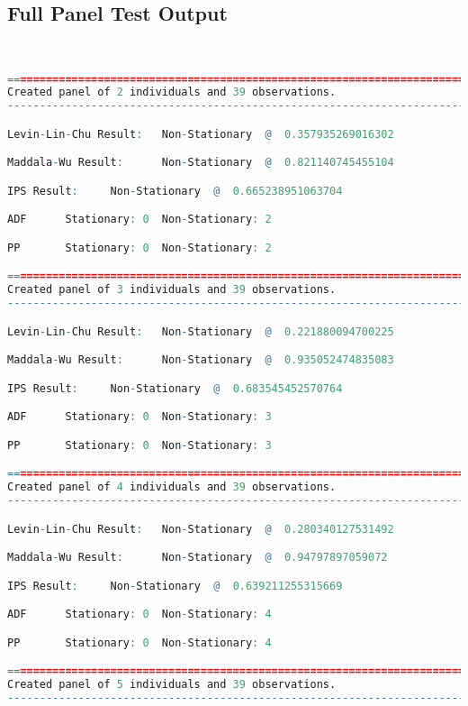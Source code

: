 \subsection{Full Panel Test Output}
\lstset{basicstyle=\tiny\tt,style=myStyle,breaklines=true,}

\begin{lstlisting}[language=R]


=========================================================================
Created panel of 2 individuals and 39 observations.
-------------------------------------------------------------------------

Levin-Lin-Chu Result:   Non-Stationary  @  0.357935269016302

Maddala-Wu Result:      Non-Stationary  @  0.821140745455104

IPS Result:     Non-Stationary  @  0.665238951063704

ADF      Stationary: 0  Non-Stationary: 2

PP       Stationary: 0  Non-Stationary: 2

=========================================================================
Created panel of 3 individuals and 39 observations.
-------------------------------------------------------------------------

Levin-Lin-Chu Result:   Non-Stationary  @  0.221880094700225

Maddala-Wu Result:      Non-Stationary  @  0.935052474835083

IPS Result:     Non-Stationary  @  0.683545452570764

ADF      Stationary: 0  Non-Stationary: 3

PP       Stationary: 0  Non-Stationary: 3

=========================================================================
Created panel of 4 individuals and 39 observations.
-------------------------------------------------------------------------

Levin-Lin-Chu Result:   Non-Stationary  @  0.280340127531492

Maddala-Wu Result:      Non-Stationary  @  0.94797897059072

IPS Result:     Non-Stationary  @  0.639211255315669

ADF      Stationary: 0  Non-Stationary: 4

PP       Stationary: 0  Non-Stationary: 4

=========================================================================
Created panel of 5 individuals and 39 observations.
-------------------------------------------------------------------------


\end{lstlisting}
